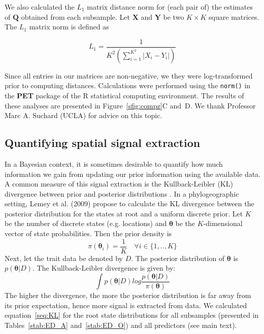 \documentclass[a4paper,10pt]{article}
\begin{document}
We also calculated the $L_1$ matrix distance norm for (each pair of) the estimates of $\mathbf{Q}$ obtained from each subsample.
Let $\mathbf{X}$ and $\mathbf{Y}$ be two $K \times K$ square matrices.
The $L_1$ matrix norm is defined as

\begin{equation}
\label{seq:L1}
 L_1 = \frac{1}{K^{2} (\sum_{i=1}^{K^2} |X_i-Y_i| ) }
\end{equation}

Since all entries in our matrices are non-negative, we they were log-transformed prior to computing distances.
Calculations were performed using the \verb|norm()| in the \textbf{PET} package of the R statistical computing environment.
The results of these analyses are presented in Figure~\ref{sfig:compz}C and~D.
We thank Professor Marc A. Suchard (UCLA) for advice on this topic.

\subsection{Quantifying spatial signal extraction}
 In a Bayesian context, it is sometimes desirable to quantify how much information we gain from updating our prior information using the available data.
 A common measure of this signal extraction is the Kullback-Leibler (KL) divergence between prior and posterior distributions \cite{M-KL}.
 In a phylogeographic setting, Lemey et al. (2009) \cite{M-roots} propose to calculate the KL divergence between the posterior distribution for the states at root and a uniform discrete prior.
 Let $K$ be the number of discrete states (e.g. locations) and $\boldsymbol\theta$ be the $K$-dimensional vector of state probabilities.
 Then the prior density is
 \begin{equation}
 \label{seq:prior}
  \pi(\boldsymbol\theta_i) = \frac{1}{K} \quad \forall i \in \{1,..,K\} 
 \end{equation}
Next, let the trait data be denoted by $D$.
The posterior distribution of $\boldsymbol\theta$ is $p(\boldsymbol\theta|D)$.
The Kullback-Leibler divergence is given by:
\begin{equation}
 \label{seq:KL}
 \int p(\boldsymbol\theta|D)log\frac{p(\boldsymbol\theta|D)}{\pi(\boldsymbol\theta)}
\end{equation}
The higher the divergence, the more the posterior distribution is far away from its prior expectation, hence more signal is extracted from data.
We calculated equation~\ref{seq:KL} for the root state distributions for all subsamples (presented in Tables~\ref{stab:ED_A} and~\ref{stab:ED_O}) and all predictors (see main text).
\end{document}
